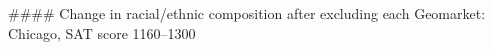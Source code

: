 #### Change in racial/ethnic composition after excluding each Geomarket: Chicago, SAT score 1160–1300
